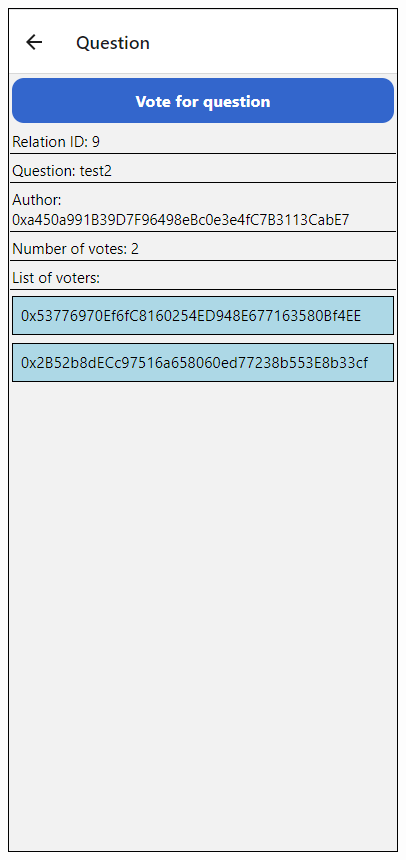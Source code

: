 \begin{figure}
\begin{minipage}{.5\textwidth}
  \label{fig:relace_otazky}
\end{minipage}%
\begin{minipage}{.5\textwidth}
  \centering
  \includegraphics[width=.9\linewidth]{obrazky/konkretni_otazka.png}
  \label{fig:konkretni_otazka}
\end{minipage}
\end{figure}

